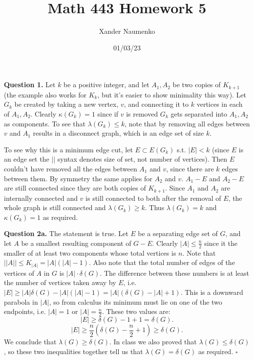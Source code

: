 \documentclass[letterpaper, reqno,11pt]{article}
\begin{document}
\title{Math 443 Homework 5}
\date{01/03/23}
\author{Xander Naumenko}
\maketitle

{\medskip\noindent\bf Question 1.} Let $k$ be a positive integer, and let $A_1,A_2$ be two copies of $K_{k+1}$ (the example also works for $K_k$, but it's easier to show minimality this way). Let $G_k$ be created by taking a new vertex, $v$, and connecting it to $k$ vertices in each of $A_1,A_2$. Clearly $\kappa(G_k)=1$ since if $v$ is removed $G_k$ gets separated into $A_1,A_2$ as components. To see that $\lambda(G_k)\leq k$, note that by removing all edges between $v$ and $A_1$ results in a disconnect graph, which is an edge set of size $k$. 

To see why this is a minimum edge cut, let $E\subset E(G_k)$ s.t. $|E|<k$ (since $E$ is an edge set the $\left|  \right| $ syntax denotes size of set, not number of vertices). Then $E$ couldn't have removed all the edges between $A_1$ and $v$, since there are $k$ edges between them. By symmetry the same applies for $A_2$ and $v$. $A_1-E$ and $A_2-E$ are still connected since they are both copies of $K_{k+1}$. Since $A_1$ and $A_2$ are internally connected and $v$ is still connected to both after the removal of $E$, the whole graph is still connected and $\lambda(G_k)\geq k$. Thus $\lambda(G_k)=k$ and $\kappa(G_k)=1$ as required. 

{\medskip\noindent\bf Question 2a.} The statement is true. Let $E$ be a separating edge set of $G$, and let $A$ be a smallest resulting component of $G-E$. Clearly $|A|\leq \frac{n}{2}$ since it the smaller of at least two components whose total vertices is $n$. Note that $| |A| |\leq K_{|A|}=|A|(|A|-1)$. Also note that the total number of edges of the vertices of $A$ in $G$ is $|A|\cdot \delta(G)$. The difference between these numbers is at least the number of vertices taken away by $E$, i.e. $|E|\geq |A| \delta(G)-|A|(|A|-1)=|A|\left( \delta(G)-|A|+1 \right) $. This is a downward parabola in $|A|$, so from calculus its minimum must lie on one of the two endpoints, i.e. $|A|=1$ or $|A|=\frac{n}{2}$. These two values are: 
\[
|E|\geq \delta(G)-1+1=\delta(G)
.\]
\[
|E|\geq \frac{n}{2}(\delta(G)-\frac{n}{2}+1)\geq \delta(G)
.\]
We conclude that $\lambda(G)\geq \delta(G)$. In class we also proved that $\lambda(G)\leq \delta(G)$, so these two inequalities together tell us that $\lambda(G)=\delta(G)$ as required. $\square$
\end{document}
